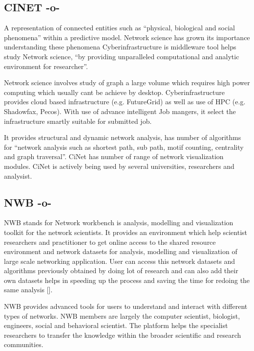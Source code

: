 \subsection{CINET -o-}

A representation of connected entities such as ``physical, biological
and social phenomena'' within a predictive
model\cite{www-bi-vt-edu}. Network science has grown its importance
understanding these phenomena Cyberinfrastructure is middleware tool
helps study Network science, ``by providing unparalleled computational
and analytic environment for
researcher''\cite{www-portal-futuresystems-org-projects-233}.
 
Network science involves study of graph a large volume which requires
high power computing which usually cant be achieve by
desktop. Cyberinfrastructure provides cloud based infrastructure
(e.g. FutureGrid) as well as use of HPC (e.g. Shadowfax, Pecos). With
use of advance intelligent Job mangers, it select the infrastructure
smartly suitable for submitted job.
     
It provides structural and dynamic network analysis, has number of
algorithms for ``network analysis such as shortest path, sub path,
motif counting, centrality and graph traversal''. CiNet has number of
range of network visualization modules.  CiNet is actively being used
by several universities, researchers and analysist.



\subsection{NWB -o-}

NWB stands for Network workbench is analysis, modelling and
visualization toolkit for the network scientists.  It provides an
environment which help scientist researchers and practitioner to get
online access to the shared resource environment and network datasets
for analysis, modelling and visualization of large scale networking
application.  User can access this network datasets and algorithms
previously obtained by doing lot of research and can also add their
own datasets helps in speeding up the process and saving the time for
redoing the same analysis [\cite{www-nwb.edu}].

NWB provides advanced tools for users to understand and interact with
different types of networks.  NWB members are largely the computer
scientist, biologist, engineers, social and behavioral scientist. The
platform helps the specialist researchers to transfer the knowledge
within the broader scientific and research communities.


